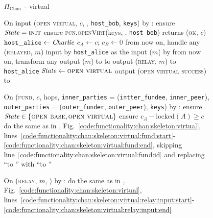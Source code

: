 \begin{figure}[H]
  \begin{protocolbox}{$\Pi_{\mathrm{Chan}}$ -- virtual}
    \begin{algorithmic}[1]
      \State {}
      \State {}
      \State On input (\textsc{open virtual}, $c$, \bob, \texttt{host\_bob},
      \texttt{keys}) by \charlie:
      \label{code:protocol:chan:skeleton:vchan:open-virtual}
      \Indent
        \State ensure $\mathit{State} = \textsc{init}$
        \State ensure \textsc{pcn.openVirt}(keys, \bob, \texttt{host\_bob})
        returns (\textsc{ok}, $c$)
        \label{code:protocol:chan:skeleton:vchan:ln}
        \State $\mathtt{host\_alice} \gets \mathit{Charlie}$
        \State $c_A \gets c$; $c_B \gets 0$
        \State from now on, handle any (\textsc{relayed}, $m$) input by
        \texttt{host\_alice} as the input ($m$) by \environment
        \State from now on, transform any output ($m$) to \environment to
        output (\textsc{relay}, $m$) to \texttt{host\_alice}
        \State $\mathit{State} \gets \textsc{open virtual}$
        \State output (\textsc{open virtual success}) to \charlie
        \label{code:protocol:chan:skeleton:vchan:open-virtual:output}
      \EndIndent
      \Statex

      \State On (\textsc{fund}, $c$, hops, \texttt{inner\_parties} =
      (\texttt{intter\_fundee}, \texttt{inner\_peer}), \texttt{outer\_parties} =
      (\texttt{outer\_funder}, \texttt{outer\_peer}), \texttt{keys}) by
      \environment:
      \Indent
        \State ensure $\mathit{State} \in \{\textsc{open base}, \textsc{open
        virtual}\}$
        \State ensure $c_A - \mathrm{locked}(A) \geq c$
        \State do the same as in \fchan,
        Fig.~\ref{code:functionality:chan:skeleton:virtual},
        lines~\ref{code:functionality:chan:skeleton:virtual:fund:start}-\ref{code:functionality:chan:skeleton:virtual:fund:end},
        skipping line~\ref{code:functionality:chan:skeleton:virtual:fund:id} and
        replacing ``to \alice'' with ``to \environment''
        \label{code:protocol:chan:skeleton:vchan}
      \EndIndent
      \Statex

      \State On (\textsc{relay}, $m$, \charlie) by \environment:
      \Indent
        \State do the same as in \fchan,
        Fig.~\ref{code:functionality:chan:skeleton:virtual},
        lines~\ref{code:functionality:chan:skeleton:virtual:relay:input:start}-\ref{code:functionality:chan:skeleton:virtual:relay:input:end}
      \EndIndent
      \Statex


\end{algorithmic}
\end{protocolbox}
\end{figure}
